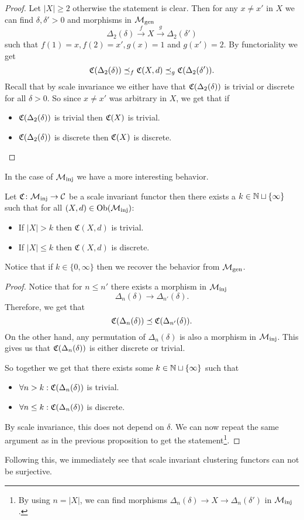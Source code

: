 \begin{proof}
    Let $|X| \ge 2$ otherwise the statement is clear.
    Then for any $x \neq x'$ in $X$ we can find $\delta, \delta' > 0$ and morphisms in ${\mathcal{M}_\mathrm{gen}}$
    $$
    \Delta_2(\delta) \overset{f}\longrightarrow X \overset{g}\longrightarrow \Delta_2(\delta')
    $$
    such that $f(1) = x, f(2) = x', g(x) = 1$ and $g(x') = 2$. By functoriality we get
    $$
    \mathfrak{C}(\Delta_2(\delta)) \preceq_f \mathfrak{C}(X,d) \preceq_g \mathfrak{C}(\Delta_2(\delta')).
    $$
    Recall that by scale invariance we either have that $\mathfrak{C}(\Delta_2(\delta))$ is trivial or discrete for all $\delta > 0$.
    So since $x \neq x'$ was arbitrary in $X$, we get that if
    \begin{itemize}
        \item $\mathfrak{C}(\Delta_2(\delta))$ is trivial then $\mathfrak{C}(X)$ is trivial.
        \item $\mathfrak{C}(\Delta_2(\delta))$ is discrete then $\mathfrak{C}(X)$ is discrete.
    \end{itemize}
\end{proof}
In the case of ${\mathcal{M}_\mathrm{inj}}$ we have a more interesting behavior.
\begin{proposition}{\cite[Thm.~6.6]{Carlsson2010}}{}
    Let $\mathfrak{C}\colon {\mathcal{M}_\mathrm{inj}} \to \mathcal{C}$ be a scale invariant functor then there exists a $k \in \mathbb N \sqcup \{\infty\}$ such that for all $(X,d) \in \mathrm {Ob}({\mathcal{M}_\mathrm{inj}})$:

    \begin{itemize}
        \item If $|X| > k$ then $\mathfrak{C}(X,d)$ is trivial.
        \item If $|X| \le k$ then $\mathfrak{C}(X,d)$ is discrete.
    \end{itemize}

    Notice that if $k \in \{0, \infty\}$ then we recover the behavior from ${\mathcal{M}_\mathrm{gen}}$.
\end{proposition}

\begin{proof}   
    Notice that for $n \le n'$ there exists a morphism in ${\mathcal{M}_\mathrm{inj}}$
    $$
    \Delta_n(\delta) \longrightarrow \Delta_{n'}(\delta).
    $$
    Therefore, we get that
    $$
    \mathfrak{C}(\Delta_n(\delta)) \preceq \mathfrak{C}(\Delta_{n'}(\delta)).
    $$
    On the other hand, any permutation of $\Delta_n(\delta)$ is also a morphism in ${\mathcal{M}_\mathrm{inj}}$. This gives us that $\mathfrak{C}(\Delta_n(\delta))$ is either discrete or trivial.

    So together we get that there exists some $k \in \mathbb N \sqcup \{\infty\}$ such that
    \begin{itemize}
        \item $\forall n > k: \mathfrak{C}(\Delta_n(\delta))$ is trivial.
        \item $\forall n \le k: \mathfrak{C}(\Delta_n(\delta))$ is discrete.
    \end{itemize}
    By scale invariance, this does not depend on $\delta$. We can now repeat the same argument as in the previous proposition to get the statement\footnote{By using $n = |X|$, we can find morphisms $\Delta_n(\delta) \to X \to \Delta_n(\delta')$ in ${\mathcal{M}_\mathrm{inj}}$.}.
\end{proof}

Following this, we immediately see that scale invariant clustering functors can not be surjective.